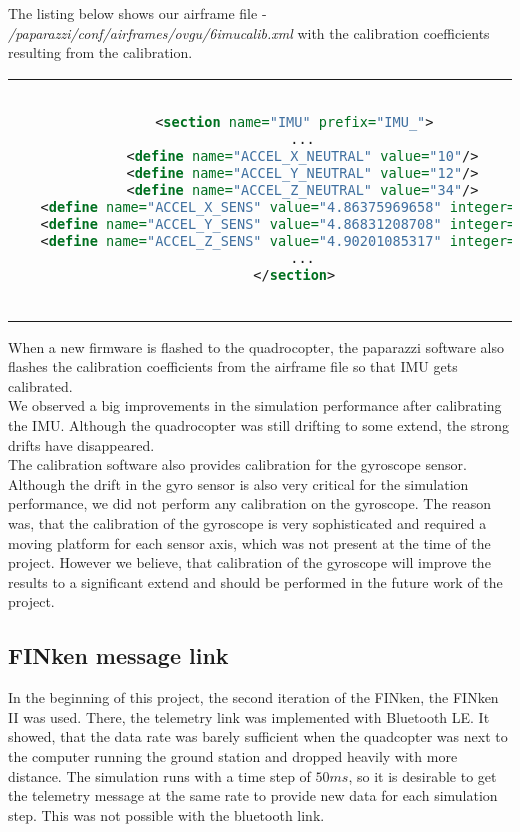 The listing below shows our airframe file - \textit{/paparazzi/conf/airframes/ovgu/6imucalib.xml} with the calibration coefficients resulting from the calibration.

\begin{center}
\begin{tabular}{c}
\begin{lstlisting}[basicstyle=\small, language=XML]

 <section name="IMU" prefix="IMU_">
   ...
   <define name="ACCEL_X_NEUTRAL" value="10"/>
   <define name="ACCEL_Y_NEUTRAL" value="12"/>
   <define name="ACCEL_Z_NEUTRAL" value="34"/>
   <define name="ACCEL_X_SENS" value="4.86375969658" integer="16"/>
   <define name="ACCEL_Y_SENS" value="4.86831208708" integer="16"/>
   <define name="ACCEL_Z_SENS" value="4.90201085317" integer="16"/>
   ...
 </section>
        
\end{lstlisting}
\end{tabular}
\end{center}

When a new firmware is flashed to the quadrocopter, the paparazzi software also flashes the calibration coefficients from the airframe file so that IMU gets calibrated. \\
We observed a big improvements in the simulation performance after calibrating the IMU. Although the quadrocopter was still drifting to some extend, the strong drifts have disappeared. \\
The calibration software also provides calibration for the gyroscope sensor. Although the drift in the gyro sensor is also very critical for the simulation performance, we did not perform any calibration on the gyroscope. The reason was, that the calibration of the gyroscope is very sophisticated and required a moving platform for each sensor axis, which was not present at the time of the project. However we believe, that calibration of the gyroscope will improve the results to a significant extend and should be performed in the future work of the project.


\subsection{FINken message link}
\label{sec:messLink}
In the beginning of this project, the second iteration of the FINken, the FINken II was used. 
There, the telemetry link was implemented with Bluetooth LE.
It showed, that the data rate was barely sufficient when the quadcopter was next to the computer running the ground station and dropped heavily with more distance.
The simulation runs with a time step of $50ms$, so it is desirable to get the telemetry message at the same rate to provide new data for each simulation step.
This was not possible with the bluetooth link.

